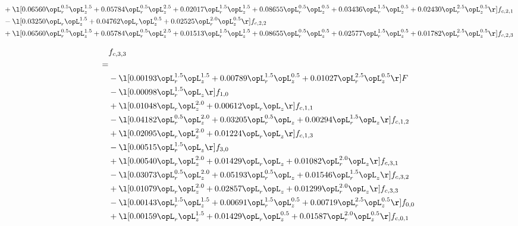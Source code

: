 \begin{alignat}{2}
& + \l[  0.06560 \opL_r^{0.5} \opL_z^{1.5} +  0.05784 \opL_r^{0.5} \opL_z^{2.5} +  0.02017 \opL_r^{1.5} \opL_z^{1.5} +  0.08655 \opL_r^{0.5} \opL_z^{0.5} +  0.03436 \opL_r^{1.5} \opL_z^{0.5} +  0.02430 \opL_r^{2.5} \opL_z^{0.5}  \r] f_{c,2,1} \nonumber \\ 
& - \l[  0.03250 \opL_r \opL_z^{1.5} +  0.04762 \opL_r \opL_z^{0.5} +  0.02525 \opL_r^{2.0} \opL_z^{0.5}  \r] f_{c,2,2} \nonumber \\ 
& + \l[  0.06560 \opL_r^{0.5} \opL_z^{1.5} +  0.05784 \opL_r^{0.5} \opL_z^{2.5} +  0.01513 \opL_r^{1.5} \opL_z^{1.5} +  0.08655 \opL_r^{0.5} \opL_z^{0.5} +  0.02577 \opL_r^{1.5} \opL_z^{0.5} +  0.01782 \opL_r^{2.5} \opL_z^{0.5}  \r] f_{c,2,3} \nonumber \\ 
\end{alignat} 


\begin{alignat}{2} 
\label{eq:f_33_1} 
& f_{c,3,3} \nonumber \\ 
 = \\ 
& - \l[  0.00193 \opL_r^{1.5} \opL_z^{1.5} +  0.00789 \opL_r^{1.5} \opL_z^{0.5} +  0.01027 \opL_r^{2.5} \opL_z^{0.5}  \r] F \nonumber \\ 
& - \l[  0.00098 \opL_r^{1.5} \opL_z  \r] f_{1,0} \nonumber \\ 
& + \l[  0.01048 \opL_r \opL_z^{2.0} +  0.00612 \opL_r \opL_z  \r] f_{c,1,1} \nonumber \\ 
& - \l[  0.04182 \opL_r^{0.5} \opL_z^{2.0} +  0.03205 \opL_r^{0.5} \opL_z +  0.00294 \opL_r^{1.5} \opL_z  \r] f_{c,1,2} \nonumber \\ 
& + \l[  0.02095 \opL_r \opL_z^{2.0} +  0.01224 \opL_r \opL_z  \r] f_{c,1,3} \nonumber \\ 
& - \l[  0.00515 \opL_r^{1.5} \opL_z  \r] f_{3,0} \nonumber \\ 
& + \l[  0.00540 \opL_r \opL_z^{2.0} +  0.01429 \opL_r \opL_z +  0.01082 \opL_r^{2.0} \opL_z  \r] f_{c,3,1} \nonumber \\ 
& - \l[  0.03073 \opL_r^{0.5} \opL_z^{2.0} +  0.05193 \opL_r^{0.5} \opL_z +  0.01546 \opL_r^{1.5} \opL_z  \r] f_{c,3,2} \nonumber \\ 
& + \l[  0.01079 \opL_r \opL_z^{2.0} +  0.02857 \opL_r \opL_z +  0.01299 \opL_r^{2.0} \opL_z  \r] f_{c,3,3} \nonumber \\ 
& - \l[  0.00143 \opL_r^{1.5} \opL_z^{1.5} +  0.00691 \opL_r^{1.5} \opL_z^{0.5} +  0.00719 \opL_r^{2.5} \opL_z^{0.5}  \r] f_{0,0} \nonumber \\ 
& + \l[  0.00159 \opL_r \opL_z^{1.5} +  0.01429 \opL_r \opL_z^{0.5} +  0.01587 \opL_r^{2.0} \opL_z^{0.5}  \r] f_{c,0,1} \nonumber \\ 

\end{alignat}
